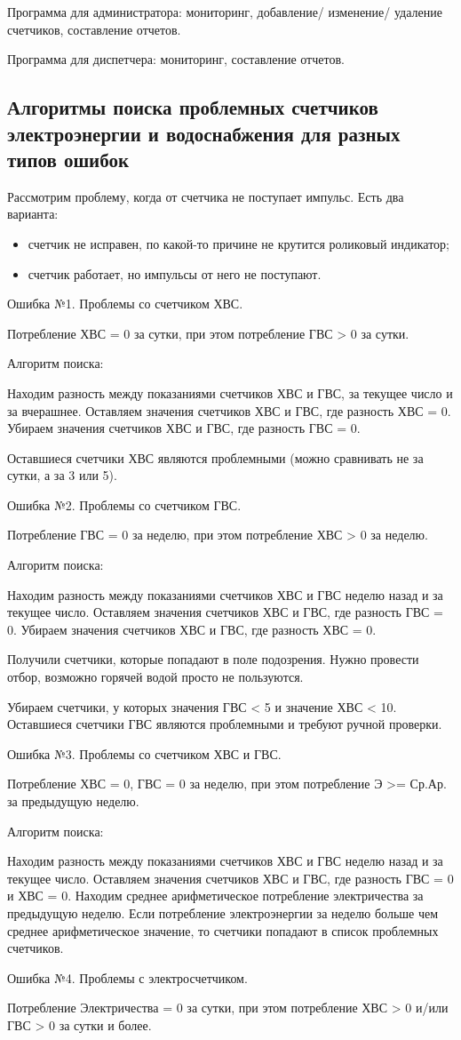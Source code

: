 Программа для администратора: мониторинг, добавление/ изменение/ удаление счетчиков, составление отчетов. 

Программа для диспетчера:  мониторинг, составление отчетов. 


\subsection{Алгоритмы поиска проблемных счетчиков электроэнергии и водоснабжения для разных типов ошибок}
Рассмотрим проблему, когда от счетчика не поступает импульс. Есть два варианта:
\begin{itemize}
	\item счетчик не исправен, по какой-то причине не крутится роликовый индикатор;
	\item счетчик работает, но импульсы от него не поступают.
\end{itemize}

Ошибка №1. Проблемы со счетчиком ХВС. 

Потребление ХВС = 0 за сутки, при этом потребление ГВС > 0 за сутки.

Алгоритм поиска:

Находим разность между показаниями счетчиков ХВС и ГВС, за текущее число и за вчерашнее.
Оставляем значения счетчиков ХВС и ГВС, где разность ХВС = 0.
Убираем значения счетчиков ХВС и ГВС, где разность ГВС = 0.

Оставшиеся счетчики ХВС являются проблемными (можно сравнивать не за сутки, а за 3 или 5).

Ошибка №2. Проблемы со счетчиком ГВС.

Потребление ГВС = 0 за неделю, при этом потребление ХВС > 0 за неделю.

Алгоритм поиска:

Находим разность между показаниями счетчиков ХВС и ГВС неделю назад и за текущее число.
Оставляем значения счетчиков ХВС и ГВС, где разность ГВС = 0.
Убираем значения счетчиков ХВС и ГВС, где разность ХВС = 0.

Получили счетчики, которые попадают в поле подозрения.
Нужно провести отбор, возможно горячей водой просто не пользуются.

Убираем счетчики, у которых значения ГВС < 5 и значение ХВС < 10.
Оставшиеся счетчики ГВС являются проблемными и требуют ручной проверки.

Ошибка №3. Проблемы со счетчиком ХВС и ГВС.

Потребление ХВС = 0, ГВС = 0 за неделю, при этом потребление Э  >= Ср.Ар. за предыдущую неделю.

Алгоритм поиска:

Находим разность между показаниями счетчиков ХВС и ГВС неделю назад и за текущее число.
Оставляем значения счетчиков ХВС и ГВС, где разность ГВС = 0 и ХВС = 0.
Находим среднее арифметическое потребление электричества за предыдущую неделю.
Если потребление электроэнергии за неделю больше чем среднее арифметическое значение, то счетчики попадают в список проблемных счетчиков.

Ошибка №4. Проблемы с электросчетчиком.

Потребление Электричества = 0 за сутки, при этом потребление ХВС > 0 и/или ГВС > 0 за сутки и более.

